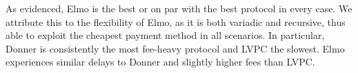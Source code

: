 %
%
%

  As evidenced, Elmo is the best or on par with the best protocol in every
  case. We attribute this to the flexibility of Elmo, as it is both variadic and
  recursive, thus able to exploit the cheapest payment method in all scenarios.
  In particular, Donner is consistently the most fee-heavy protocol and LVPC the
  slowest. Elmo experiences similar delays to Donner and slightly higher fees
  than LVPC.

